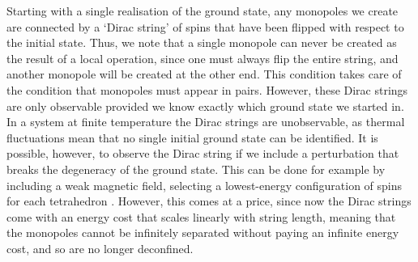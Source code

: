 Starting with a single realisation of the ground state, any monopoles we create are connected by a `Dirac string' of spins that have been flipped with respect to the initial state. Thus, we note that a single monopole can never be created as the result of a local operation, since one must always flip the entire string, and another monopole will be created at the other end. This condition takes care of the condition that monopoles must appear in pairs. However, these Dirac strings are only observable provided we know exactly which ground state we started in. In a system at finite temperature the Dirac strings are unobservable, as thermal fluctuations mean that no single initial ground state can be identified. It is possible, however, to observe the Dirac string if we include a perturbation that breaks the degeneracy of the ground state. This can be done for example by including a weak magnetic field, selecting a lowest-energy configuration of spins for each tetrahedron \cite{morris_dirac_2009}. However, this comes at a price, since now the Dirac strings come with an energy cost that scales linearly with string length, meaning that the monopoles cannot be infinitely separated without paying an infinite energy cost, and so are no longer deconfined.


